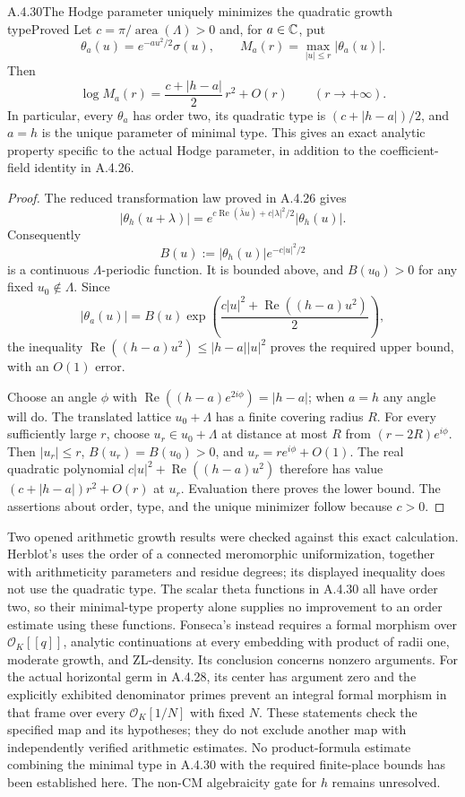 \begin{result}{A.4.30}{The Hodge parameter uniquely minimizes the quadratic growth type}{Proved}
Let $c=\pi/\operatorname{area}(\Lambda)>0$ and, for $a\in\mathbb C$, put
\[
 \theta_a(u)=e^{-au^2/2}\sigma(u),\qquad
 M_a(r)=\max_{|u|\le r}|\theta_a(u)|.
\]
Then
\[
 \log M_a(r)=\frac{c+|h-a|}{2}\,r^2+O(r)
 \qquad(r\longrightarrow+\infty).
\]
In particular, every $\theta_a$ has order two, its quadratic type is
$(c+|h-a|)/2$, and $a=h$ is the unique parameter of minimal type.
This gives an exact analytic property specific to the actual Hodge
parameter, in addition to the coefficient-field identity in A.4.26.
\end{result}
\begin{proof}
The reduced transformation law proved in A.4.26 gives
\[
 |\theta_h(u+\lambda)|
 =e^{c\operatorname{Re}(\bar\lambda u)+c|\lambda|^2/2}
   |\theta_h(u)|.
\]
Consequently
\[
 B(u):=|\theta_h(u)|e^{-c|u|^2/2}
\]
is a continuous $\Lambda$-periodic function. It is bounded above,
and $B(u_0)>0$ for any fixed $u_0\notin\Lambda$. Since
\[
 |\theta_a(u)|=
 B(u)\exp\!\left(\frac{c|u|^2+
                 \operatorname{Re}((h-a)u^2)}2\right),
\]
the inequality
$\operatorname{Re}((h-a)u^2)\le |h-a||u|^2$
proves the required upper bound, with an $O(1)$ error.

Choose an angle $\phi$ with
$\operatorname{Re}((h-a)e^{2i\phi})=|h-a|$; when $a=h$ any
angle will do. The translated lattice $u_0+\Lambda$ has a finite
covering radius $R$. For every sufficiently large $r$, choose
$u_r\in u_0+\Lambda$ at distance at most $R$ from
$(r-2R)e^{i\phi}$. Then $|u_r|\le r$, $B(u_r)=B(u_0)>0$, and
$u_r=re^{i\phi}+O(1)$. The real quadratic polynomial
$c|u|^2+\operatorname{Re}((h-a)u^2)$ therefore has value
$(c+|h-a|)r^2+O(r)$ at $u_r$. Evaluation there proves the lower
bound. The assertions about order, type, and the unique minimizer
follow because $c>0$.
\end{proof}

Two opened arithmetic growth results were checked against this exact
calculation. Herblot's \cite[Theorem 6.1, pp.31--32]{EllHerblot2012}
uses the order of a connected meromorphic uniformization, together
with arithmeticity parameters and residue degrees; its displayed
inequality does not use the quadratic type. The scalar theta
functions in A.4.30 all have order two, so their minimal-type
property alone supplies no improvement to an order estimate using
these functions.
Fonseca's \cite[Theorem 1.2, p.648]{EllFonseca2019} instead requires
a formal morphism over $\mathcal O_K[[q]]$, analytic continuations at
every embedding with product of radii one, moderate growth, and
ZL-density. Its conclusion concerns nonzero arguments.
For the actual horizontal germ in A.4.28, its center has argument
zero and the explicitly exhibited denominator primes prevent an
integral formal morphism in that frame over every
$\mathcal O_K[1/N]$ with fixed $N$. These statements check the
specified map and its hypotheses; they do not exclude another
map with independently verified arithmetic estimates.
No product-formula estimate combining the minimal type in A.4.30
with the required finite-place bounds has been established here.
The non-CM algebraicity gate for $h$ remains unresolved.

